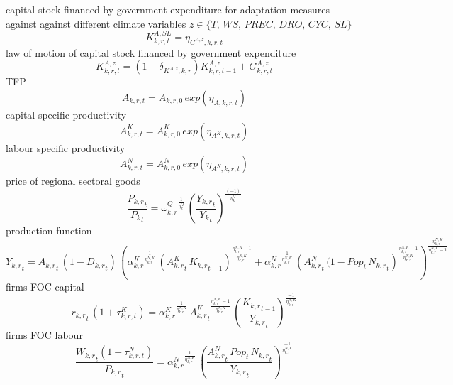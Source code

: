 capital stock financed by government expenditure for adaptation measures against against different climate variables $z \in \{T,\, WS,\, PREC, \, DRO,\, CYC,\, SL\}$
\begin{dmath}
K^{A,SL}_{k,r,t}=\eta_{G^{A,z},k,r,t}
\end{dmath}
law of motion of capital stock financed by government expenditure
\begin{dmath}
K^{A,z}_{k,r,t}= (1 - \delta_{K^{A,z},k,r}) K^{A,z}_{k,r,t-1} + G^{A,z}_{k,r,t}
\end{dmath}
TFP
\begin{dmath}
A_{k,r,t}= A_{k,r,0} \, exp\left({\eta_{A,k,r,t}}\right)
\end{dmath}
capital specific productivity
\begin{dmath}
A^{K}_{k,r,t}= A^{K}_{k,r,0} \, exp\left({\eta_{A^{K},k,r,t}}\right)
\end{dmath}
labour specific productivity
\begin{dmath}
A^{N}_{k,r,t}= A^{N}_{k,r,0} \, exp\left({\eta_{A^{N},k,r,t}}\right)
\end{dmath}
price of regional sectoral goods
\begin{dmath}
\frac{{{P_{k,r}}_{t}}}{{{P_k}_{t}}}={{\omega^{Q}_{k,r}}}^{\frac{1}{{{\eta^{Q}_{k}}}}}\, \left(\frac{{{Y_{k,r}}_{t}}}{{{Y_k}_{t}}}\right)^{\frac{\left(-1\right)}{{{\eta^{Q}_{k}}}}}
\end{dmath}
production function
\begin{dmath}
{{Y_{k,r}}_{t}}={{A_{k,r}}_{t}}\, \left(1-{{D_{k,r}}_{t}}\right)\, \left({{\alpha^{K}_{k,r}}}^{\frac{1}{{{\eta^{N,K}_{k,r}}}}}\, \left({{A^{K}_{k,r}}_{t}}\, {{K_{k,r}}_{t-1}}\right)^{\frac{{{\eta^{N,K}_{k,r}}}-1}{{{\eta^{N,K}_{k,r}}}}}+{{\alpha^{N}_{k,r}}}^{\frac{1}{{{\eta^{N,K}_{k,r}}}}}\, \left({{A^{N}_{k,r}}_{t}}\, (1 -  {Pop_{t}}\, {{N_{k,r}}_{t}}\right)^{\frac{{{\eta^{N,K}_{k,r}}}-1}{{{\eta^{N,K}_{k,r}}}}}\right)^{\frac{{{\eta^{N,K}_{k,r}}}}{{{\eta^{N,K}_{k,r}}}-1}}
\end{dmath}
firms FOC capital
\begin{dmath}
{{r_{k,r}}_{t}} \, \left(1+\tau^{K}_{k,r,t}\right)={{\alpha^{K}_{k,r}}}^{\frac{1}{{{\eta^{N,K}_{k,r}}}}}\, {{A^{K}_{k,r}}_{t}}^{\frac{{{\eta^{N,K}_{k,r}}}-1}{{{\eta^{N,K}_{k,r}}}}}\, \left(\frac{{{K_{k,r}}_{t-1}}}{{{Y_{k,r}}_{t}}}\right)^{\frac{-1}{{{\eta^{N,K}_{k,r}}}}}
\end{dmath}
firms FOC labour
\begin{dmath}
\frac{{{W_{k,r}}_{t}}\left(1+\tau^{N}_{k,r,t}\right)}{{{P_{k,r}}_{t}}}={{\alpha^{N}_{k,r}}}^{\frac{1}{{{\eta^{N,K}_{k,r}}}}}\, \left(\frac{{{A^{N}_{k,r}}_{t}}\, {Pop_{t}}\, {{N_{k,r}}_{t}}}{{{Y_{k,r}}_{t}}}\right)^{\frac{-1}{{{\eta^{N,K}_{k,r}}}}}
\end{dmath}

